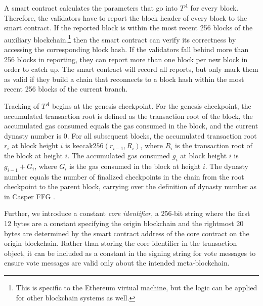 \documentclass[12pt,a4paper]{article}
\begin{document}
A smart contract calculates the parameters that go into $T^A$ for every block.
Therefore, the validators have to report the block header of every block to the smart contract.
If the reported block is within the most recent 256 blocks of the auxiliary blockchain,\footnote{
	This is specific to the Ethereum virtual machine, but the logic can be applied for other blockchain systems as well.
}
then the smart contract can verify its correctness by accessing the corresponding block hash.
If the validators fall behind more than 256 blocks in reporting, they can report more than one block per new block in order to catch up.
The smart contract will record all reports, but only mark them as valid if they build a chain that reconnects to a block hash within the most recent 256 blocks of the current branch.

Tracking of $T^A$ begins at the genesis checkpoint.
For the genesis checkpoint, the accumulated transaction root is defined as the transaction root of the block, the accumulated gas consumed equals the gas consumed in the block, and the current dynasty number is 0.
For all subsequent blocks, the accumulated transaction root $r_i$ at block height $i$ is $\text{keccak256}(r_{i-1}, R_i)$, where $R_i$ is the transaction root of the block at height $i$.
The accumulated gas consumed $g_i$ at block height $i$ is $g_{i-1} + G_i$, where $G_i$ is the gas consumed in the block at height $i$.
The dynasty number equals the number of finalized checkpoints in the chain from the root checkpoint to the parent block, carrying over the definition of dynasty number as in Casper FFG \cite{casperffg}.

Further, we introduce a constant \emph{core identifier}, a 256-bit string where the first 12 bytes are a constant specifying the origin blockchain and the rightmost 20 bytes are determined by the smart contract address of the core contract on the origin blockchain.
Rather than storing the core identifier in the transaction object, it can be included as a constant in the signing string for vote messages to ensure vote messages are valid only about the intended meta-blockchain.

\end{document}
